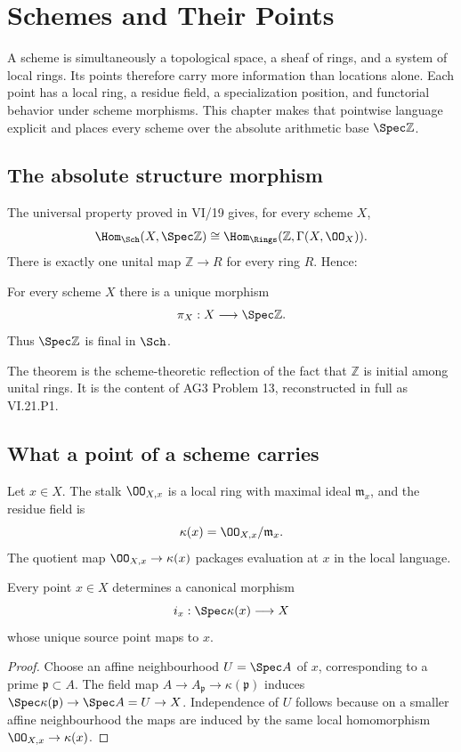 \chapter{Schemes and Their Points}\label{ch:vi21-schemes-points}

A scheme is simultaneously a topological space, a sheaf of rings, and a system of local
rings.  Its points therefore carry more information than locations alone.  Each point has a
local ring, a residue field, a specialization position, and functorial behavior under scheme
morphisms.  This chapter makes that pointwise language explicit and places every scheme over
the absolute arithmetic base $\Spec\mathbb Z$.

\section{The absolute structure morphism}
The universal property proved in VI/19 gives, for every scheme $X$,
\[
 \Hom_{\Sch}(X,\Spec\mathbb Z)
 \cong \Hom_{\Rings}(\mathbb Z,\Gamma(X,\OO_X)).
\]
There is exactly one unital map $\mathbb Z\to R$ for every ring $R$.  Hence:

\begin{theorem}\label{thm:vi21-absolute-structure}
For every scheme $X$ there is a unique morphism
\[
 \pi_X:X\longrightarrow \Spec\mathbb Z.
\]
Thus $\Spec\mathbb Z$ is final in $\Sch$.
\end{theorem}

\begin{remark}
The theorem is the scheme-theoretic reflection of the fact that $\mathbb Z$ is initial among
unital rings.  It is the content of AG3 Problem 13, reconstructed in full as VI.21.P1.
\end{remark}



\section{What a point of a scheme carries}
Let $x\in X$.  The stalk $\OO_{X,x}$ is a local ring with maximal ideal
$\mathfrak m_x$, and the residue field is
\[
 \kappa(x)=\OO_{X,x}/\mathfrak m_x.
\]
The quotient map $\OO_{X,x}\to\kappa(x)$ packages evaluation at $x$ in the local language.

\begin{proposition}\label{prop:vi21-residue-point}
Every point $x\in X$ determines a canonical morphism
\[
 i_x:\Spec\kappa(x)\longrightarrow X
\]
whose unique source point maps to $x$.
\end{proposition}
\begin{proof}
Choose an affine neighbourhood $U=\Spec A$ of $x$, corresponding to a prime
$\mathfrak p\subset A$.  The field map $A\to A_{\mathfrak p}\to\kappa(\mathfrak p)$ induces
$\Spec\kappa(\mathfrak p)\to\Spec A=U\to X$.  Independence of $U$ follows because on a smaller
affine neighbourhood the maps are induced by the same local homomorphism
$\OO_{X,x}\to\kappa(x)$.
\end{proof}

